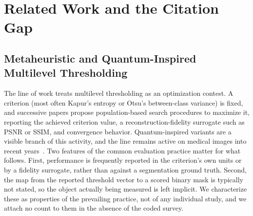 %
%
\section{Related Work and the Citation Gap}
\label{sec:related}

\subsection{Metaheuristic and Quantum-Inspired Multilevel Thresholding}

The line of work treats multilevel thresholding as an optimization contest. A
criterion (most often Kapur's entropy or Otsu's between-class variance) is
fixed, and successive papers propose population-based search procedures to
maximize it, reporting the achieved criterion value, a reconstruction-fidelity
surrogate such as PSNR or SSIM, and convergence behavior. Quantum-inspired
variants are a visible branch of this activity, and the line remains active on
medical images into recent years~\cite{alnajdawi_scirep,mousavirad_kbs}. Two
features of the common evaluation practice matter for what follows. First,
performance is frequently reported in the criterion's own units or by a
fidelity surrogate, rather than against a segmentation ground truth. Second, the
map from the reported threshold vector to a scored binary mask is typically not
stated, so the object actually being measured is left implicit. We characterize
these as properties of the prevailing practice, not of any individual study, and
we attach no count to them in the absence of the coded survey.

